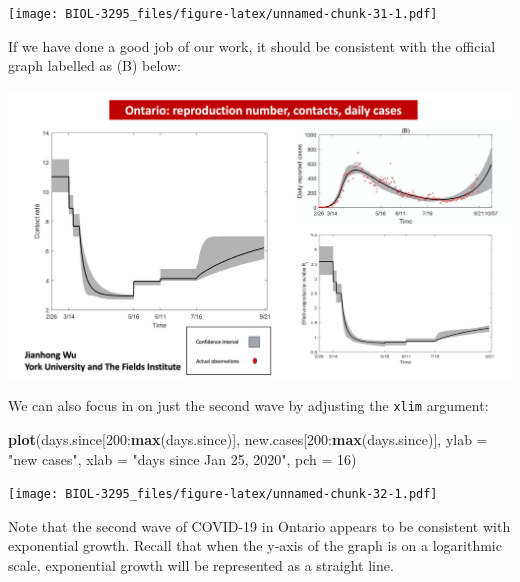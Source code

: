 \documentclass[]{book}
\newenvironment{Shaded}{\begin{snugshade}}{\end{snugshade}}
\newcommand{\KeywordTok}[1]{\textcolor[rgb]{0.13,0.29,0.53}{\textbf{{#1}}}}
\newcommand{\DataTypeTok}[1]{\textcolor[rgb]{0.13,0.29,0.53}{{#1}}}
\newcommand{\DecValTok}[1]{\textcolor[rgb]{0.00,0.00,0.81}{{#1}}}
\newcommand{\StringTok}[1]{\textcolor[rgb]{0.31,0.60,0.02}{{#1}}}
\newcommand{\NormalTok}[1]{{#1}}
\begin{document}
\texttt{[image: BIOL-3295\_files/figure-latex/unnamed-chunk-31-1.pdf]}

If we have done a good job of our work, it should be consistent with the
official graph labelled as (B) below:

\includegraphics[width=1.2\linewidth]{figures/ONData}

We can also focus in on just the second wave by adjusting the
\texttt{xlim} argument:

\begin{Shaded}
\begin{Highlighting}[]
\KeywordTok{plot}\NormalTok{(days.since[}\DecValTok{200}\NormalTok{:}\KeywordTok{max}\NormalTok{(days.since)], new.cases[}\DecValTok{200}\NormalTok{:}\KeywordTok{max}\NormalTok{(days.since)], }\DataTypeTok{ylab =} \StringTok{"new cases"}\NormalTok{, }\DataTypeTok{xlab =} \StringTok{"days since Jan 25, 2020"}\NormalTok{, }\DataTypeTok{pch =} \DecValTok{16}\NormalTok{)}
\end{Highlighting}
\end{Shaded}

\texttt{[image: BIOL-3295\_files/figure-latex/unnamed-chunk-32-1.pdf]}

Note that the second wave of COVID-19 in Ontario appears to be
consistent with exponential growth. Recall that when the y-axis of the
graph is on a logarithmic scale, exponential growth will be represented
as a straight line.
\end{document}
